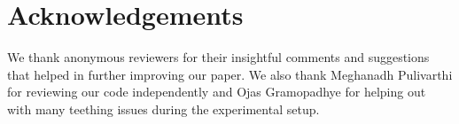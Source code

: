 \section*{Acknowledgements}
We thank anonymous reviewers for
their insightful comments and suggestions that helped in further improving our paper.
We also thank Meghanadh Pulivarthi for reviewing our code independently and Ojas Gramopadhye for helping out with many teething issues during the experimental setup.
